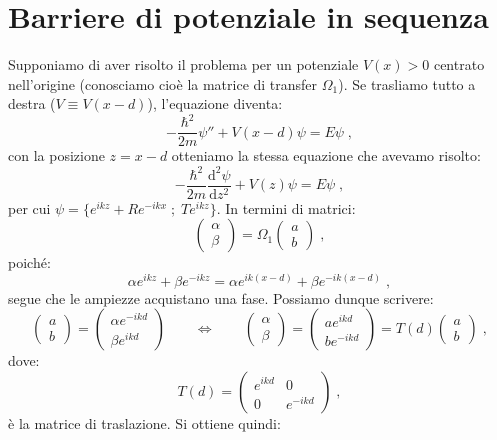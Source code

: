 \documentclass[12pt,a4paper]{report}
\theoremstyle{definition}
\newcommand{\dev}[3][]{\frac{\mathrm{d}^{#1} #2}{\mathrm{d} #3^{#1}}}
\numberwithin{equation}{section}
\begin{document}
\section{Barriere di potenziale in sequenza}
Supponiamo di aver risolto il problema per un potenziale $V(x)>0$ centrato nell'origine (conosciamo cioè la matrice di transfer $\Omega_1$). Se trasliamo tutto a destra ($V\equiv V(x-d)$), l'equazione diventa:
\begin{equation}
-\frac{\hbar^2}{2m}\psi''+V(x-d)\psi=E\psi\;,
\end{equation}
con la posizione $z=x-d$ otteniamo la stessa equazione che avevamo risolto:
$$
-\frac{\hbar^2}{2m}\dev[2]{\psi}{z}+V(z)\psi=E\psi\;,
$$
per cui $\psi=\{e^{ikz}+Re^{-ikx}\; ;\; Te^{ikz}\}$. In termini di matrici:
$$
\left(\begin{matrix}
\alpha \\
\beta
\end{matrix}\right)=\Omega_1\left(
\begin{matrix}
a \\
b
\end{matrix}\right)\;,
$$
poiché:
$$
\alpha e^{ikz}+\beta e^{-ikz}=\alpha e^{ik(x-d)}+\beta e^{-ik(x-d)}\;,
$$
segue che le ampiezze acquistano una fase. Possiamo dunque scrivere:
$$
\left(\begin{matrix}
a \\
b
\end{matrix}\right)=\left(
\begin{matrix}
\alpha e^{-ikd} \\
\beta e^{ikd}
\end{matrix}\right)\qquad \Longleftrightarrow \qquad \left(
\begin{matrix}
\alpha \\
\beta
\end{matrix}\right)=\left(
\begin{matrix}
a e^{ikd} \\
b e^{-ikd}
\end{matrix}\right)=T(d)\left(
\begin{matrix}
a \\
b
\end{matrix}\right)\;,
$$
dove:
\begin{equation}
T(d)=\left(
\begin{matrix}
e^{ikd} & 0 \\
0 & e^{-ikd}
\end{matrix}\right)\;,
\end{equation}
è la matrice di traslazione. Si ottiene quindi:
\end{document}
